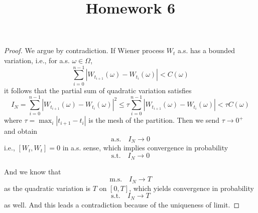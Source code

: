 \documentclass{homework}
\title{Homework 6}
\begin{document}
    \maketitle    

    \problem
    \begin{proof}
        We argue by contradiction. If Wiener process
        $W_t$ a.s. has a bounded variation, i.e.,
        for a.s. $\omega\in\Omega$,
        \[\sum_{i=0}^{n-1}
        |W_{t_{i+1}}(\omega)-W_{t_i}(\omega)|<C(\omega)\]
        it follows that the partial sum of quadratic variation
        satisfies
        \[I_N=\sum_{i=0}^{n-1}
        |W_{t_{i+1}}(\omega)-W_{t_i}(\omega)|^2\leq
        \tau\sum_{i=0}^{n-1}|W_{t_{i+1}}(\omega)-W_{t_i}(\omega)|
        <\tau C(\omega)\]
        where $\tau=\max_i|t_{i+1}-t_i|$ is the mesh of the
        partition.
        Then we send $\tau\to 0^+$ and obtain
        \[\text{a.s.}\quad I_N\to 0\]
        i.e., $[W_t,W_t]=0$ in a.s. sense, which implies
        convergence in probability
        \[\text{s.t.}\quad I_N\to 0\]
        
        And we know that
        \[\text{m.s.}\quad I_N\to T\]
        as the quadratic variation is $T$ on $[0,T]$,
        which yields convergence in probability
        \[\text{s.t.}\quad I_N\to T\]
        as well. And this leads a contradiction because of the
        uniqueness of limit.
    \end{proof}

    \skipproblem
\end{document}
